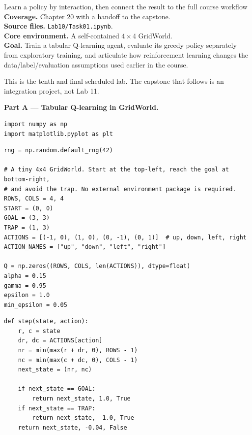
\begin{labproject}{Learn a policy by interaction, then connect the result to the full course workflow}
\textbf{Coverage.} Chapter 20 with a handoff to the capstone.\\
\textbf{Source files.} \texttt{Lab10/Task01.ipynb}.\\
\textbf{Core environment.} A self-contained $4\times4$ GridWorld.\\
\textbf{Goal.} Train a tabular Q-learning agent, evaluate its greedy policy separately from exploratory training, and articulate how reinforcement learning changes the data/label/evaluation assumptions used earlier in the course.

\begin{labmode}
This is the tenth and final scheduled lab. The capstone that follows is an integration project, not Lab 11.
\end{labmode}

\medskip\noindent\textbf{Part A --- Tabular Q-learning in GridWorld.}\par
\begin{lstlisting}[style=mlpython]
import numpy as np
import matplotlib.pyplot as plt
\end{lstlisting}

\begin{lstlisting}[style=mlpython]
rng = np.random.default_rng(42)

# A tiny 4x4 GridWorld. Start at the top-left, reach the goal at bottom-right,
# and avoid the trap. No external environment package is required.
ROWS, COLS = 4, 4
START = (0, 0)
GOAL = (3, 3)
TRAP = (1, 3)
ACTIONS = [(-1, 0), (1, 0), (0, -1), (0, 1)]  # up, down, left, right
ACTION_NAMES = ["up", "down", "left", "right"]

Q = np.zeros((ROWS, COLS, len(ACTIONS)), dtype=float)
alpha = 0.15
gamma = 0.95
epsilon = 1.0
min_epsilon = 0.05
\end{lstlisting}

\begin{lstlisting}[style=mlpython]
def step(state, action):
    r, c = state
    dr, dc = ACTIONS[action]
    nr = min(max(r + dr, 0), ROWS - 1)
    nc = min(max(c + dc, 0), COLS - 1)
    next_state = (nr, nc)

    if next_state == GOAL:
        return next_state, 1.0, True
    if next_state == TRAP:
        return next_state, -1.0, True
    return next_state, -0.04, False
\end{lstlisting}


\end{labproject}
